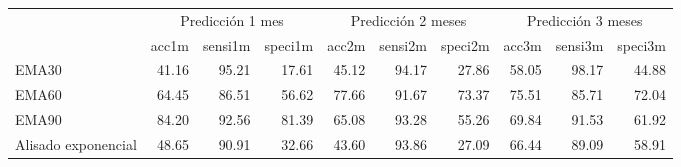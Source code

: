 \documentclass[]{article}
\newenvironment{Shaded}{\begin{snugshade}}{\end{snugshade}}
\newcommand{\KeywordTok}[1]{\textcolor[rgb]{0.13,0.29,0.53}{\textbf{#1}}}
\newcommand{\DataTypeTok}[1]{\textcolor[rgb]{0.13,0.29,0.53}{#1}}
\newcommand{\DecValTok}[1]{\textcolor[rgb]{0.00,0.00,0.81}{#1}}
\newcommand{\StringTok}[1]{\textcolor[rgb]{0.31,0.60,0.02}{#1}}
\newcommand{\OperatorTok}[1]{\textcolor[rgb]{0.81,0.36,0.00}{\textbf{#1}}}
\newcommand{\NormalTok}[1]{#1}
\begin{document}
\begin{Shaded}
\end{Shaded}

\begin{table}[H]
\centering\begingroup\fontsize{10}{12}\selectfont

\begin{tabular}{l|r|r|r|r|r|r|r|r|r}
\hline
\multicolumn{1}{c|}{ } & \multicolumn{3}{|c|}{Predicción 1 mes} & \multicolumn{3}{|c|}{Predicción 2 meses} & \multicolumn{3}{|c}{Predicción 3 meses} \\
\cline{2-4} \cline{5-7} \cline{8-10}
  & acc1m & sensi1m & speci1m & acc2m & sensi2m & speci2m & acc3m & sensi3m & speci3m\\
\hline
EMA30 & 41.16 & 95.21 & 17.61 & 45.12 & 94.17 & 27.86 & 58.05 & 98.17 & 44.88\\
\hline
EMA60 & 64.45 & 86.51 & 56.62 & 77.66 & 91.67 & 73.37 & 75.51 & 85.71 & 72.04\\
\hline
EMA90 & 84.20 & 92.56 & 81.39 & 65.08 & 93.28 & 55.26 & 69.84 & 91.53 & 61.92\\
\hline
Alisado exponencial & 48.65 & 90.91 & 32.66 & 43.60 & 93.86 & 27.09 & 66.44 & 89.09 & 58.91\\
\hline
\end{tabular}\endgroup{}
\end{table}
\end{document}
